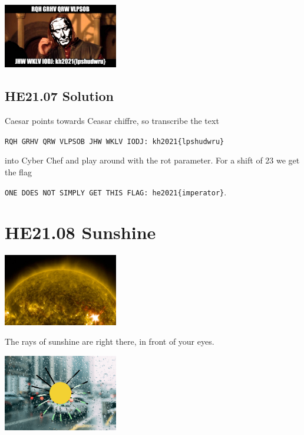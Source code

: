 \documentclass[english,a4paper,nols,noindent]{tufte-handout}
\begin{document}
\begin{marginfigure}
    \includegraphics[width=50mm]{ch07/caesarsmeme.jpg}
\end{marginfigure}

\hypertarget{he21.07-solution}{%
\subsection{HE21.07 Solution}\label{he21.07-solution}}

Caesar points towards Ceasar chiffre, so transcribe the text

\verb+RQH GRHV QRW VLPSOB JHW WKLV IODJ: kh2021{lpshudwru}+

into Cyber Chef and play around with the rot parameter.  For a shift
of 23 we get the flag

\verb+ONE DOES NOT SIMPLY GET THIS FLAG: he2021{imperator}+.

\hypertarget{he21.08}{%
\section{HE21.08 Sunshine}\label{he21.08}}
\begin{marginfigure}
    \includegraphics[width=50mm]{images/challenge8.jpg}
\end{marginfigure}

\noindent The rays of sunshine are right there, in front of your eyes.

\begin{marginfigure}
    \includegraphics[width=50mm]{ch08/sunshine.png}
\end{marginfigure}
\end{document}
